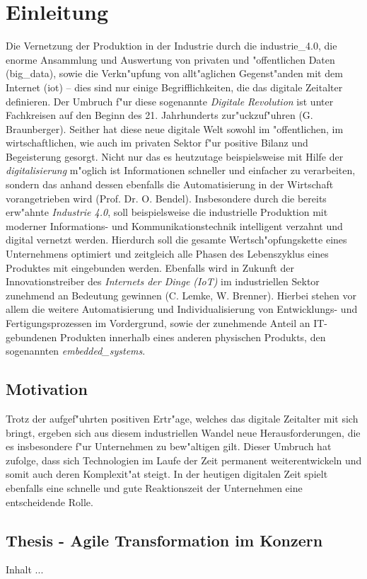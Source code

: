 

\chapter{Einleitung}
\minitoc
\vspace{1 cm} 

Die Vernetzung der Produktion in der Industrie durch die \gls{industrie_4.0}, die enorme 
Ansammlung und Auswertung von privaten und "offentlichen Daten (\gls{big_data}), sowie die 
Verkn"upfung von allt"aglichen Gegenst"anden mit dem Internet (\gls{iot}) -- dies sind nur
einige Begrifflichkeiten, die das digitale Zeitalter definieren. Der Umbruch f"ur diese 
sogenannte \textit{Digitale Revolution} ist unter Fachkreisen auf den Beginn des 21. 
Jahrhunderts zur"uckzuf"uhren \cite{qeins} (G. Braunberger). Seither hat diese neue digitale 
Welt sowohl im "offentlichen, im wirtschaftlichen, wie auch im privaten Sektor f"ur positive Bilanz 
und Begeisterung gesorgt. Nicht nur das es heutzutage beispielsweise mit Hilfe der 
\textit{\gls{digitalisierung}} m"oglich ist Informationen schneller und einfacher zu verarbeiten, 
sondern das anhand dessen ebenfalls die Automatisierung in der Wirtschaft vorangetrieben 
wird \cite{qzwei} (Prof. Dr. O. Bendel). Insbesondere durch die bereits erw"ahnte \textit{Industrie 4.0}, soll beispielsweise die industrielle Produktion mit moderner Informations- und Kommunikationstechnik intelligent verzahnt und digital vernetzt werden. Hierdurch soll die gesamte Wertsch"opfungskette eines Unternehmens optimiert und zeitgleich alle Phasen des Lebenszyklus eines Produktes mit eingebunden werden. Ebenfalls wird in Zukunft der Innovationstreiber des \textit{Internets der Dinge (IoT)} im industriellen Sektor zunehmend an Bedeutung gewinnen \cite{qdrei} (C. Lemke, W. Brenner). Hierbei stehen vor allem die weitere Automatisierung und Individualisierung von Entwicklungs- und Fertigungsprozessen im Vordergrund, sowie der zunehmende Anteil an IT-gebundenen Produkten innerhalb eines anderen physischen Produkts, den sogenannten \textit{\gls{embedded_systems}}.


\section{Motivation}
Trotz der aufgef"uhrten positiven Ertr"age, welches das digitale Zeitalter mit sich bringt, ergeben sich aus diesem industriellen Wandel neue Herausforderungen, die es insbesondere f"ur Unternehmen zu bew"altigen gilt. Dieser Umbruch hat zufolge, dass sich Technologien im Laufe der Zeit permanent weiterentwickeln und somit auch deren Komplexit"at steigt. In der heutigen digitalen Zeit spielt ebenfalls eine schnelle und gute Reaktionszeit der Unternehmen 
eine entscheidende Rolle. 

\section{Thesis - Agile Transformation im Konzern}
Inhalt ...



